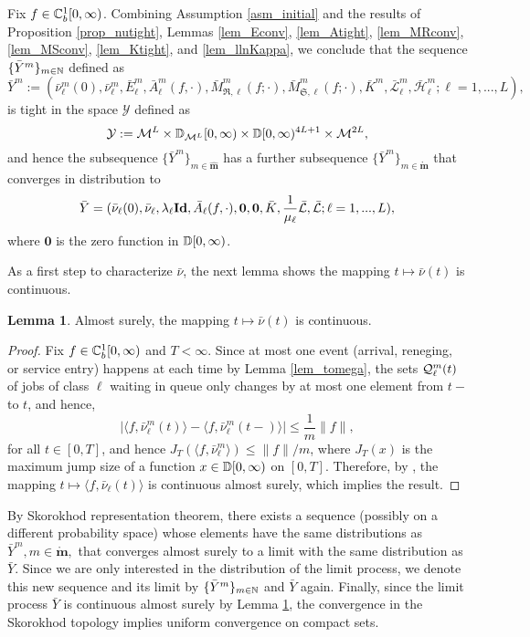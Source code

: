 \documentclass{article}
\theoremstyle{definition}
\newtheorem{lemma}[theorem]{Lemma}
\numberwithin{equation}{section}
\begin{document}
Fix $f\in\mathbb{C}_b^{1}[0,\infty)$. Combining Assumption \ref{asm_initial} and the results of  Proposition \ref{prop_nutight}, Lemmas \ref{lem_Econv}, \ref{lem_Atight}, \ref{lem_MRconv}, \ref{lem_MSconv}, \ref{lem_Ktight}, and \ref{lem_llnKappa}, we conclude that the sequence $\{\bar Y^m\}_{m\in\mathbb{N}}$ defined as
\[\bar Y^m := (\bar\nu_\ell^m(0),\bar\nu^m_\ell,\bar E^m_\ell,\bar A^m_\ell(f,\cdot),\bar M^m_{\mathfrak{R},\ell}(f;\cdot),\bar M^m_{\mathfrak{S},\ell}(f;\cdot),\bar K^m,\bar{\mathcal{L}}^m_\ell,\bar{\mathcal{H}}_\ell^m;\ell=1,...,L ), \]
is tight in the space $\mathcal{Y}$ defined as
\[
\mathcal{Y}:=\mathcal{M}^L\times\mathbb{D}_{\mathcal{M}^L}[0,\infty)\times \mathbb{D}[0,\infty)^{4L+1}\times \mathcal{M}^{2L},
\]
and hence the subsequence $\{\bar Y^m\}_{m\in\mathbf{\hat m}}$ has a further subsequence  $\{\bar Y^m\}_{m\in\mathbf{\mathring{ m}}}$
that converges in distribution to 
\[
\bar Y = (\bar\nu_\ell(0),\bar\nu_\ell,\lambda_\ell\textbf{Id},\bar A_\ell(f,\cdot),\mathbf{0},\mathbf{0},\bar K,\frac{1}{\mu_\ell}\bar{\mathcal{L}},\bar{\mathcal{L}};\ell=1,...,L ),
\]
where $\mathbf{0}$ is the zero function in $\mathbb{D}[0,\infty)$. 

As a first step to characterize $\bar\nu$, the next lemma shows the mapping $t\mapsto\bar\nu(t)$ is continuous.

\begin{lemma}\label{lem_Ycont}
Almost surely, the mapping $t\mapsto\bar\nu(t)$ is continuous.
\end{lemma}
\begin{proof}
Fix $f\in\mathbb{C}_b^{1}[0,\infty)$ and $T<\infty$. Since at most one event (arrival, reneging, or service entry) happens at each time by Lemma \ref{lem_tomega}, the sets $\mathcal{Q}_\ell^m(t)$  of jobs of class $\ell$ waiting in queue only changes by at most one element from $t-$ to $t$, and hence, 
\[ |\langle f,\bar\nu^m_\ell(t) \rangle  - \langle f, \bar\nu_\ell^m(t-)\rangle | \leq \frac{1}{m}\|f\|,\]
for all $t\in[0,T]$, and hence $J_T(\langle f,\bar\nu_\ell^m\rangle )\leq \|f\|/m$, where $J_T(x)$ is the maximum jump size of a function $x\in\mathbb{D}[0,\infty)$ on $[0,T]$. Therefore, by \cite[Theorem 13.4]{BillingsleyBook}, the mapping $t\mapsto\langle f,\bar\nu_\ell(t)\rangle$ is continuous almost surely, which implies the result.
\end{proof}
By Skorokhod representation theorem, there exists a sequence (possibly on a different probability space) whose elements have the same distributions as $\bar Y^m, m\in\mathbf{\mathring{m}},$ that converges almost surely to a limit with the same distribution as $\bar Y$. Since we are only interested in the distribution of the limit process, we denote this new sequence and its limit by $\{\bar Y^m\}_{m\in\mathbb{N}}$ and $\bar Y$ again. Finally, since the limit process $\bar Y$ is continuous almost surely by Lemma \ref{lem_Ycont}, the convergence in the Skorokhod topology implies uniform convergence on compact sets.
\end{document}
